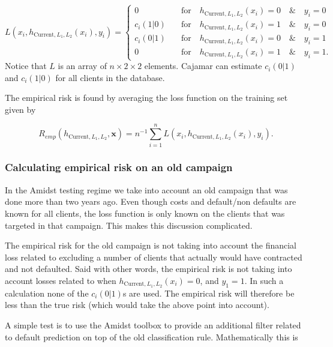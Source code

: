 \documentclass{article}
\theoremstyle{theorem}
\theoremstyle{definition}
\newcommand{\bv}[1]{\bm{#1}}
\begin{document}
\begin{equation}
\label{def:empRiskBank}
L(x_i, h_{\mbox{Current},L_1,L_2}(x_i) , y_i) = 
\begin{cases}
0     &\quad \mbox{for} \quad h_{\mbox{Current},L_1,L_2}(x_i) = 0 \quad \& \quad y_i = 0\\
c_i(1|0)    &\quad \mbox{for} \quad h_{\mbox{Current},L_1,L_2}(x_i) = 1 \quad \& \quad y_i = 0\\
c_i(0|1)      &\quad \mbox{for} \quad h_{\mbox{Current},L_1,L_2}(x_i) = 0 \quad \& \quad y_i = 1\\
0   &\quad \mbox{for} \quad h_{\mbox{Current},L_1,L_2}(x_i) = 1 \quad \& \quad y_i = 1.
\end{cases}
\end{equation}
Notice that $L$ is an array of $n \times 2\times 2$ elements. Cajamar can estimate $c_i(0|1)$ and $c_i(1|0)$ for all clients in the database.

The empirical risk is found by averaging the loss function on the training set given by 

\begin{equation}
\label{def:empRisk}
R_{emp}(h_{\mbox{Current},L_1,L_2}, \bv{x}) = n^{-1} \sum_{i=1}^n L(x_i, h_{\mbox{Current},L_1,L_2}(x_i), y_i).
\end{equation}

\subsubsection*{Calculating empirical risk on an old campaign}

In the Amidst testing regime we take into account an old campaign that was done more than two years ago. Even though costs and default/non defaults are known for all clients, the loss function is only known on the clients that was targeted in that campaign.  This makes this discussion complicated. 

The empirical risk for the old campaign is not taking into account the financial loss related to excluding a number of clients that actually would have contracted and not defaulted.  Said with other words, the empirical risk is not taking into account losses related to when $h_{\mbox{Current},L_1,L_2}(x_i) = 0$, and $y_1 = 1$.  In such a calculation none of the $c_i(0|1)$s are used.  The empirical risk will therefore be less than the true risk (which would take the above point into account).

A simple test is to use the Amidst toolbox to provide an additional filter related to default prediction on top of the old classification rule.  Mathematically this is
\end{document}
